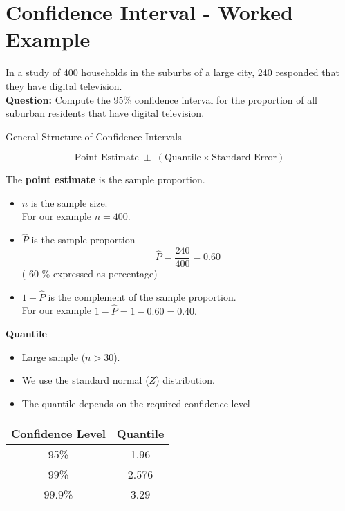 \documentclass[a4paper,12pt]{article}
\begin{document}
\section*{Confidence Interval - Worked Example}

In a study of 400 households in the suburbs of a large city, 240 responded
that they have digital television.
\\
\bigskip
\textbf{Question:} Compute the 95\% confidence interval for the proportion of all suburban residents that have digital television.


\begin{framed}
General Structure of Confidence Intervals

\[
\mbox{Point Estimate} \; \pm \; \left( \mbox{Quantile} \times \mbox{Standard Error} \right)
\]
\end{framed}



The \textbf{point estimate} is the sample proportion.
\begin{itemize}
	\item $n$ is the sample size. \\
	For our example $n = 400$.
	\vspace{0.1cm}
	\item $\hat{P}$ is the sample proportion
	\[ \hat{P} = \frac{240}{400} = 0.60 \]
	( 60 \% expressed as percentage)
	\vspace{0.1cm}
	\item $1 - \hat{P}$ is the complement of the sample proportion.\\ For our example $1- \hat{P} = 1 - 0.60  =  0.40.$
	
\end{itemize}


\textbf{Quantile}
\begin{itemize}
	\item Large sample ($n >30$).
	\item We use the standard normal ($Z$) distribution.
	\item The quantile depends on the required confidence level
\end{itemize}
\begin{center}
	\begin{tabular}{|c|c|}
		\hline \phantom{sp} Confidence Level \phantom{sp}  &  \phantom{sp} Quantile \phantom{sp} \\ 
		\hline  95\% & 1.96  \\ 
		\hline  99\% & 2.576 \\ 
		\hline  99.9\%& 3.29  \\ 
		\hline 
	\end{tabular} 
\end{center}
\end{document}
